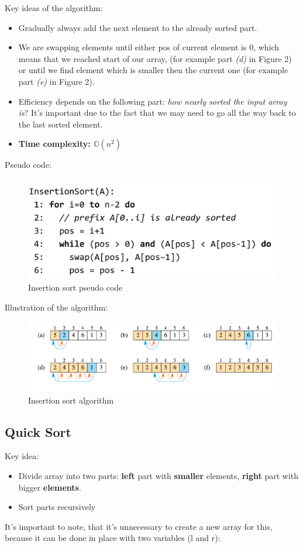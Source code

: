\documentclass[a4paper,
  twoside, %
  headlines=2.1 %
  ]{scrartcl}
\begin{document}
    Key ideas of the algorithm:
    \begin{itemize}
        \item Gradually always add the next element to the already sorted part.
        
        \item We are swapping elements until either pos of current element is 0, which means that we reached start of our array, (for example part \textit{(d)} in Figure 2) or until we find element which is smaller then the current one (for example part \textit{(e)} in Figure 2).

        \item Efficiency depends on the following part: \textit{how nearly sorted the input array is}? It's important due to the fact that we may need to go all the way back to the last sorted element.

        \item \textbf{Time complexity: $\mathbb{O}(n^{2})$}
    \end{itemize}
    Pseudo code:
    \begin{figure}[H]
        \centering
        \includegraphics[width=0.5\linewidth]{insertion_sort_pseudocode.png}
        \caption{Insertion sort pseudo code}
        \label{fig:enter-label}
    \end{figure}
    Illustration of the algorithm:
    \begin{figure}[H]
        \centering
        \includegraphics[width=0.7\linewidth]{insertion_sort_algo.png}
        \caption{Insertion sort algorithm}
        \label{fig:enter-label}
    \end{figure}

    \clearpage
    \subsection*{Quick Sort}

    Key idea:
    \begin{itemize}
        \item Divide array into two parts: \textbf{left} part with \textbf{smaller} elements, \textbf{right} part with bigger \textbf{elements}.
        \item Sort parts recursively
    \end{itemize}
    It's important to note, that it's unnecessary to create a new array for this, because it can be done in place with two variables (l and r):
    
\end{document}
